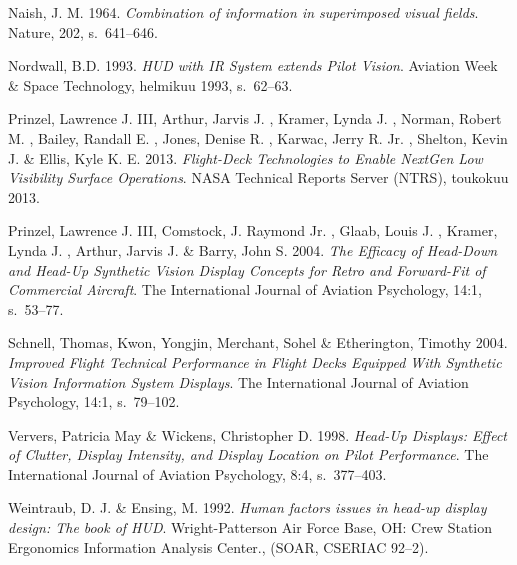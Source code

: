 \documentclass[utf8,bachelor,manualbib]{gradu3}
\begin{document}
\begin{thebibliography}{}
Naish, J. M. 1964.
\textit{Combination of information in superimposed visual fields}.
Nature, 202, s.~641--646.

Nordwall, B.D. 1993.
\textit{HUD with IR System extends Pilot Vision}.
Aviation Week \& Space Technology, helmikuu 1993, s.~62--63.

Prinzel, Lawrence J. III, Arthur, Jarvis J. , Kramer, Lynda J. ,  Norman, Robert M. , Bailey, Randall E. , Jones, Denise R. ,  Karwac, Jerry R. Jr. , Shelton, Kevin J. \& Ellis, Kyle K. E. 2013.
\textit{Flight-Deck Technologies to Enable NextGen Low Visibility Surface Operations}.
NASA Technical Reports Server (NTRS), toukokuu 2013.

Prinzel, Lawrence J. III, Comstock, J. Raymond Jr. , Glaab, Louis J. , Kramer, Lynda J. , Arthur, Jarvis J. \& Barry, John S. 2004.
\textit{The Efficacy of Head-Down and Head-Up Synthetic Vision Display Concepts for Retro and Forward-Fit of Commercial Aircraft}.
The International Journal of Aviation Psychology, 14:1, s.~53--77.

Schnell, Thomas,  Kwon, Yongjin, Merchant, Sohel \& Etherington, Timothy 2004.
\textit{Improved Flight Technical Performance in Flight Decks Equipped With Synthetic Vision Information System Displays}.
The International Journal of Aviation Psychology, 14:1, s.~79--102.

Ververs, Patricia May \& Wickens, Christopher D. 1998.
\textit{Head-Up Displays: Effect of Clutter, Display Intensity, and Display Location on Pilot Performance}.
The International Journal of Aviation Psychology, 8:4, s.~377--403.

Weintraub, D. J. \& Ensing, M. 1992.
\textit{Human factors issues in head-up display design: The book of
HUD}.
Wright-Patterson Air Force Base, OH: Crew Station Ergonomics
Information Analysis Center., (SOAR, CSERIAC 92–2).


\end{thebibliography}
\end{document}
